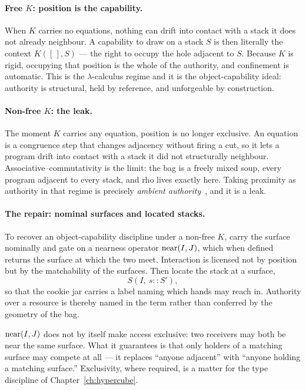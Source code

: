\paragraph{Free $K$: position is the capability.} When $K$ carries no equations, nothing
can drift into contact with a stack it does not already neighbour. A capability to draw
on a stack $S$ is then literally the context $K([\,], S)$ --- the right to occupy the hole
adjacent to $S$. Because $K$ is rigid, occupying that position is the whole of the
authority, and confinement is automatic. This is the $\lambda$-calculus regime and it is
the object-capability ideal: authority is structural, held by reference, and unforgeable
by construction.

\paragraph{Non-free $K$: the leak.} The moment $K$ carries any equation, position is no
longer exclusive. An equation is a congruence step that changes adjacency without firing
a cut, so it lets a program drift into contact with a stack it did not structurally
neighbour. Associative--commutativity is the limit: the bag is a freely mixed soup, every
program adjacent to every stack, and rho lives exactly here. Taking proximity as
authority in that regime is precisely \emph{ambient authority}~\cite{MillerYeeShapiro2003},
and it is a leak.

\paragraph{The repair: nominal surfaces and located stacks.} To recover an
object-capability discipline under a non-free $K$, carry the surface nominally and gate on
a nearness operator $\mathrm{near}(I,J)$, which when defined returns the surface at which the two
meet. Interaction is licensed not by position but by the matchability of the surfaces.
Then locate the stack at a surface,
\[
  S(I,\ s :: S') ,
\]
so that the cookie jar carries a label naming which hands may reach in. Authority over a
resource is thereby named in the term rather than conferred by the geometry of the bag.

\begin{remark}
$\mathrm{near}(I,J)$ does not by itself make access exclusive: two receivers may both be near the
same surface. What it guarantees is that only holders of a matching surface may compete
at all --- it replaces ``anyone adjacent'' with ``anyone holding a matching surface.''
Exclusivity, where required, is a matter for the type discipline of
Chapter~\ref{ch:hypercube}.
\end{remark}
